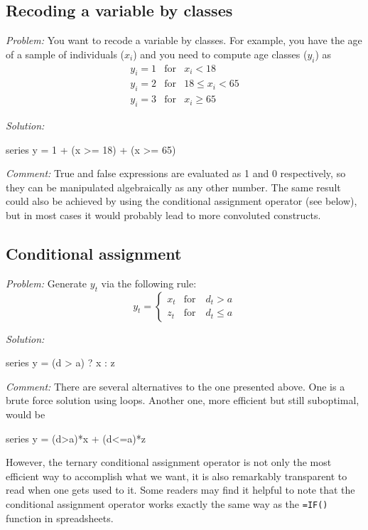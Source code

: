 \subsection{Recoding a variable by classes}

\emph{Problem:} You want to recode a variable by classes. For example,
you have the age of a sample of individuals ($x_i$) and you need to
compute age classes ($y_i$) as
\begin{eqnarray*}
  y_i = 1 & \mathrm{for} & x_i < 18 \\
  y_i = 2 & \mathrm{for} & 18 \le x_i < 65 \\
  y_i = 3 & \mathrm{for} & x_i \ge 65
\end{eqnarray*}

\emph{Solution:}
\begin{code}
series y = 1 + (x >= 18) + (x >= 65)
\end{code}

\emph{Comment:} True and false expressions are evaluated as 1 and 0
respectively, so they can be manipulated algebraically as any other
number. The same result could also be achieved by using the
conditional assignment operator (see below), but in most cases it
would probably lead to more convoluted constructs.

\subsection{Conditional assignment}

\emph{Problem:} Generate $y_t$ via the following rule:
\[
  y_t = \left\{
    \begin{array}{ll}
      x_t & \mathrm{for} \quad d_t > a \\
      z_t & \mathrm{for} \quad d_t \le a
    \end{array}
    \right.
\]

\emph{Solution:}
\begin{code}
series y = (d > a) ? x : z
\end{code}

\emph{Comment:} There are several alternatives to the one presented
above. One is a brute force solution using loops. Another one, more
efficient but still suboptimal, would be
\begin{code}
series y = (d>a)*x + (d<=a)*z
\end{code}
However, the ternary conditional assignment operator is not only the
most efficient way to accomplish what we want, it is also remarkably
transparent to read when one gets used to it. Some readers may find it
helpful to note that the conditional assignment operator works exactly
the same way as the \texttt{=IF()} function in spreadsheets.

